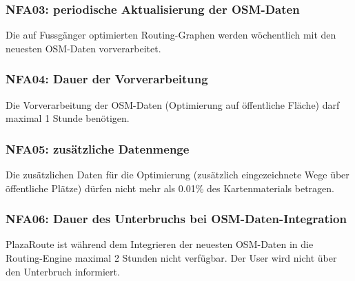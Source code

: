 \subsubsection{NFA03: periodische Aktualisierung der OSM-Daten}
\label{NFA:NFA03}

Die auf Fussgänger optimierten Routing-Graphen werden wöchentlich mit den neuesten \ac{OSM}-Daten vorverarbeitet.

\subsubsection{NFA04: Dauer der Vorverarbeitung}
\label{NFA:NFA04}

Die Vorverarbeitung der \ac{OSM}-Daten (Optimierung auf öffentliche Fläche) darf maximal 1 Stunde benötigen.

\subsubsection{NFA05: zusätzliche Datenmenge}
\label{NFA:NFA05}

Die zusätzlichen Daten für die Optimierung (zusätzlich eingezeichnete Wege über öffentliche Plätze) dürfen nicht mehr als 0.01\% des Kartenmaterials betragen.

\subsubsection{NFA06: Dauer des Unterbruchs bei OSM-Daten-Integration}
\label{NFA:NFA06}

PlazaRoute ist während dem Integrieren der neuesten \ac{OSM}-Daten in die Routing-Engine maximal 2 Stunden nicht verfügbar. Der User wird nicht über den Unterbruch informiert.
